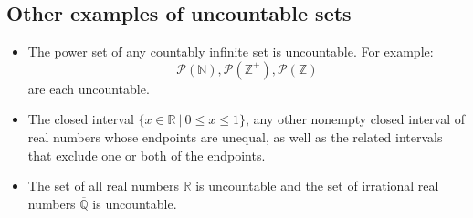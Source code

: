 \documentclass[12pt, oneside]{article}
\begin{document}
  \subsection*{Other examples of uncountable sets}


\begin{itemize}
    \item The power set of any countably infinite set is uncountable. For example:
    \[
        \mathcal{P}(\mathbb{N}), \mathcal{P}(\mathbb{Z^+}), \mathcal{P}(\mathbb{Z})
    \]
    are each uncountable.
    \item The closed interval $\{x \in \mathbb{R} ~|~ 0 \leq x \leq 1\}$, any other nonempty closed interval of real numbers whose endpoints are 
    unequal, as well as the related intervals that exclude one or both of the endpoints.
    \item The set of all real numbers $\mathbb{R}$ is uncountable and the set of irrational
    real numbers $\overline{\mathbb{Q}}$ is uncountable.
\end{itemize} \newpage
\end{document}
